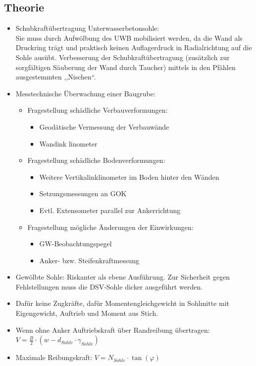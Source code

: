 \documentclass[fleqn,twoside]{article}
\begin{document}
\subsection{Theorie}
\begin{itemize}
    \item Schubkraftübertragung Unterwasserbetonsohle:\\
    Sie muss durch Aufwölbung des UWB mobilisiert werden, da die Wand als Druckring trägt und praktisch keinen Auflagerdruck in Radialrichtung auf die Sohle ausübt. Verbesserung der Schubkraftübertragung (zusätzlich zur sorgfältigen Säuberung der Wand durch Taucher) mittels in den Pfählen ausgestemmten ,,Nischen“.
    \item Messtechnische Überwachung einer Baugrube: 
        \begin{itemize}
            \item Fragestellung schädliche Verbauverformungen:
                \begin{itemize}
                    \item Geodätische Vermessung der Verbauwände
                    \item Wandink linometer
                \end{itemize}
            \item Fragestellung schädliche Bodenverformungen:
                \begin{itemize}
                    \item Weitere Vertikalinklinometer im Boden hinter den Wänden
                    \item Setzungsmessungen an GOK
                    \item Evtl. Extensometer parallel zur Ankerrichtung
                \end{itemize}
            \item Fragestellung mögliche Änderungen der Einwirkungen:
                \begin{itemize}
                    \item GW-Beobachtungspegel
                    \item Anker- bzw. Steifenkraftmessung
                \end{itemize}
        \end{itemize}
    \item Gewölbte Sohle: Riskanter als ebene  Ausführung. Zur Sicherheit gegen Fehlstellungen muss die DSV-Sohle dicker ausgeführt werden.
    \item Dafür keine Zugkräfte, dafür Momentengleichgewicht in Sohlmitte mit Eigengewicht, Auftrieb und Moment aus Stich.
    \item Wenn ohne Anker Auftriebskraft über Randreibung übertragen: $V=\frac{B}{2}\cdot (w-d_{Sohle} \cdot \gamma_{Sohle})$
    \item Maximale Reibungskraft: $V = N_{Sohle} \cdot \tan(\varphi)$
\end{itemize}
\end{document}

